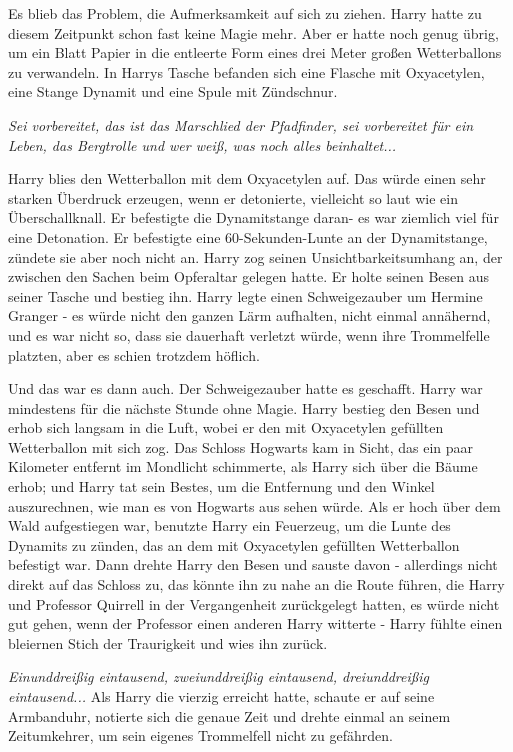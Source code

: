 Es blieb das Problem, die Aufmerksamkeit auf sich zu ziehen. Harry hatte zu
diesem Zeitpunkt schon fast keine Magie mehr. Aber er hatte noch genug übrig, um
ein Blatt Papier in die entleerte Form eines drei Meter großen Wetterballons zu
verwandeln. In Harrys Tasche befanden sich eine Flasche mit Oxyacetylen, eine
Stange Dynamit und eine Spule mit Zündschnur.

\emph{Sei vorbereitet, das ist das Marschlied der Pfadfinder, sei vorbereitet
für ein Leben, das Bergtrolle und wer weiß, was noch alles beinhaltet...}

Harry blies den Wetterballon mit dem Oxyacetylen auf. Das würde einen sehr
starken Überdruck erzeugen, wenn er detonierte, vielleicht so laut wie ein
Überschallknall. Er befestigte die Dynamitstange daran- es war ziemlich viel für
eine Detonation. Er befestigte eine 60-Sekunden-Lunte an der Dynamitstange,
zündete sie aber noch nicht an. Harry zog seinen Unsichtbarkeitsumhang an, der
zwischen den Sachen beim Opferaltar gelegen hatte. Er holte seinen Besen aus
seiner Tasche und bestieg ihn. Harry legte einen Schweigezauber um Hermine
Granger - es würde nicht den ganzen Lärm aufhalten, nicht einmal annähernd, und
es war nicht so, dass sie dauerhaft verletzt würde, wenn ihre Trommelfelle
platzten, aber es schien trotzdem höflich.

Und das war es dann auch. Der Schweigezauber hatte es geschafft. Harry war
mindestens für die nächste Stunde ohne Magie. Harry bestieg den Besen und erhob
sich langsam in die Luft, wobei er den mit Oxyacetylen gefüllten Wetterballon
mit sich zog. Das Schloss Hogwarts kam in Sicht, das ein paar Kilometer entfernt
im Mondlicht schimmerte, als Harry sich über die Bäume erhob; und Harry tat sein
Bestes, um die Entfernung und den Winkel auszurechnen, wie man es von Hogwarts
aus sehen würde. Als er hoch über dem Wald aufgestiegen war, benutzte Harry ein
Feuerzeug, um die Lunte des Dynamits zu zünden, das an dem mit Oxyacetylen
gefüllten Wetterballon befestigt war. Dann drehte Harry den Besen und sauste
davon - allerdings nicht direkt auf das Schloss zu, das könnte ihn zu nahe an
die Route führen, die Harry und Professor Quirrell in der Vergangenheit
zurückgelegt hatten, es würde nicht gut gehen, wenn der Professor einen anderen
Harry witterte - Harry fühlte einen bleiernen Stich der Traurigkeit und wies ihn
zurück.

\emph{Einunddreißig eintausend, zweiunddreißig eintausend, dreiunddreißig
eintausend...} Als Harry die vierzig erreicht hatte, schaute er auf seine
Armbanduhr, notierte sich die genaue Zeit und drehte einmal an seinem
Zeitumkehrer, um sein eigenes Trommelfell nicht zu gefährden.

